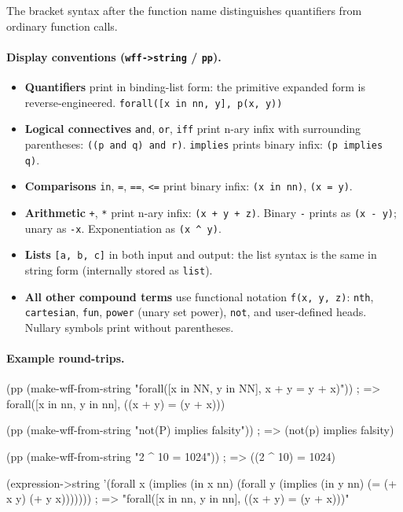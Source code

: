\noindent
The bracket syntax after the function name distinguishes quantifiers
from ordinary function calls.

\paragraph{Display conventions (\texttt{wff->string} / \texttt{pp}).}
\begin{itemize}
\item \begin{sloppypar}\textbf{Quantifiers} print in binding-list form:
  the primitive expanded form is reverse-engineered.
  \texttt{forall([x in nn, y], p(x, y))}\end{sloppypar}
\item \textbf{Logical connectives} \texttt{and}, \texttt{or}, \texttt{iff}
  print n-ary infix with surrounding parentheses:
  \texttt{((p and q) and r)}.
  \texttt{implies} prints binary infix: \texttt{(p implies q)}.
\item \textbf{Comparisons} \texttt{in}, \texttt{=}, \texttt{==},
  \texttt{<=} print binary infix: \texttt{(x in nn)}, \texttt{(x = y)}.
\item \textbf{Arithmetic} \texttt{+}, \texttt{*} print n-ary infix:
  \texttt{(x + y + z)}.  Binary \texttt{-} prints as \texttt{(x - y)};
  unary as \texttt{-x}.  Exponentiation as \texttt{(x \textasciicircum{} y)}.
\item \textbf{Lists} \texttt{[a, b, c]} in both input and output: the
  list syntax is the same in string form (internally stored as \texttt{list}).
\item \textbf{All other compound terms} use functional notation
  \texttt{f(x, y, z)}: \texttt{nth}, \texttt{cartesian}, \texttt{fun},
  \texttt{power} (unary set power), \texttt{not}, and user-defined heads.
  Nullary symbols print without parentheses.
\end{itemize}

\paragraph{Example round-trips.}
\begin{VNBsnip}
(pp (make-wff-from-string "forall([x in NN, y in NN], x + y = y + x)"))
; => forall([x in nn, y in nn], ((x + y) = (y + x)))

(pp (make-wff-from-string "not(P) implies falsity"))
; => (not(p) implies falsity)

(pp (make-wff-from-string "2 ^ 10 = 1024"))
; => ((2 ^ 10) = 1024)

(expression->string '(forall x (implies (in x nn)
                       (forall y (implies (in y nn) (= (+ x y) (+ y x)))))))
; => "forall([x in nn, y in nn], ((x + y) = (y + x)))"
\end{VNBsnip}

